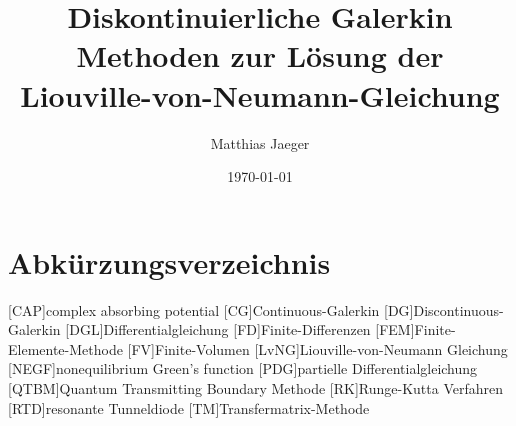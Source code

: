 \documentclass[
  tucolor,
  BCOR=12mm,     %
  parskip=half,  %
  open=any,      %
  cleardoublepage=plain,  %
]{tudothesis}
\author{Matthias Jaeger}
\title{Diskontinuierliche Galerkin Methoden zur Lösung der Liouville-von-Neumann-Gleichung}
\date{\today}
\begin{document}
\frontmatter
\maketitle

\makecorrectorpage



% 
\tableofcontents
\clearpage \newpage
\chapter{Abkürzungsverzeichnis}
\begin{acronym}[NEGF]
  [CAP]{complex absorbing potential}
  [CG]{Continuous-Galerkin}
  [DG]{Discontinuous-Galerkin}
  [DGL]{Differentialgleichung}
  [FD]{Finite-Differenzen}
  [FEM]{Finite-Elemente-Methode}
  [FV]{Finite-Volumen}
  [LvNG]{Liouville-von-Neumann Gleichung}
  [NEGF]{nonequilibrium Green’s function}
  [PDG]{partielle Differentialgleichung}
  [QTBM]{Quantum Transmitting Boundary Methode}
  [RK]{Runge-Kutta Verfahren}
  [RTD]{resonante Tunneldiode}
  [TM]{Transfermatrix-Methode}
\end{acronym}


%
\mainmatter




% 
% 
%
\appendix

%
\backmatter
\printbibliography
\printindex
%
% 
\end{document}
